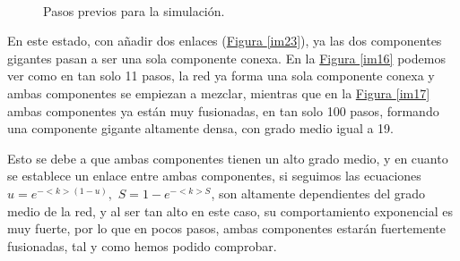 \documentclass[paper=a4, fontsize=11pt]{article} %
\numberwithin{equation}{section} %
\numberwithin{figure}{section} %
\numberwithin{table}{section} %
\begin{document}
\begin{figure}[H]
    \centering
    \mbox{
    }
    \mbox{
        \qquad
    }
    \caption{Pasos previos para la simulación.}
    \label{imej23}
\end{figure}

En este estado, con añadir dos enlaces (\hyperref[im23]{Figura \ref{im23}}), ya las dos componentes gigantes pasan a ser una sola componente conexa. En la \hyperref[im16]{Figura \ref{im16}} podemos ver como en tan solo 11 pasos, la red ya forma una sola componente conexa y ambas componentes se empiezan a mezclar, mientras que en la \hyperref[im17]{Figura \ref{im17}} ambas componentes ya están muy fusionadas, en tan solo 100 pasos, formando una componente gigante altamente densa, con grado medio igual a 19.

Esto se debe a que ambas componentes tienen un alto grado medio, y en cuanto se establece un enlace entre ambas componentes, si seguimos las ecuaciones $u=e^{- <k>(1-u)},$ $S = 1-e^{-<k>S}$, son altamente dependientes del grado medio de la red, y al ser tan alto en este caso, su comportamiento exponencial es muy fuerte, por lo que en pocos pasos, ambas componentes estarán fuertemente fusionadas, tal y como hemos podido comprobar.
\end{document}
